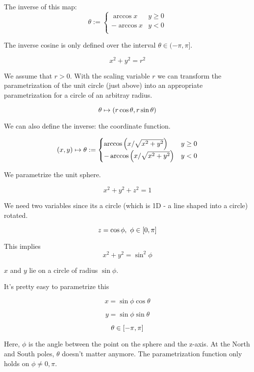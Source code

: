 \documentclass[11pt]{article}
\begin{document}
\begin{example}
  
  The inverse of this map:
  $$
  \theta :=
  \begin{cases}
    \arccos{x} & y \geq 0 \\
    - \arccos{x} & y < 0 \\
  \end{cases}
  $$

  The inverse cosine is only defined over the interval $\theta \in (-\pi, \pi]$.
\end{example}


\begin{example}

  $$x^2 + y^2 = r^2$$

  We assume that $r>0$.
  With the scaling variable $r$ we can transform the parametrization of the unit circle (just above) into an appropriate parametrization for a circle of an arbitray radius.

  
  $$
  \theta \mapsto \left ( r \cos \theta, r \sin \theta \right)
  $$

  We can also define the inverse: the coordinate function.

  $$
  \left ( x, y \right) \mapsto \theta := \begin{cases}
    \arccos \left ( x/\sqrt{x^2 + y^2} \right) & y \geq 0\\
    -\arccos \left ( x/\sqrt{x^2 + y^2} \right) & y < 0 \\
    \end{cases}
  $$
  
\end{example}

\begin{example}

  We parametrize the unit sphere.

  $$x^2 + y^2 + z^2 = 1$$

We need two variables since its a circle (which is 1D - a line shaped into a circle) rotated.

$$z = \cos \phi,\ \phi \in \left [ 0, \pi \right]$$

This implies $$x^2 +y^2 = \sin^2 \phi$$

$x$ and $y$ lie on a circle of radius $\sin \phi$.

It's pretty easy to parametrize this

$$x = \sin\phi \cos \theta$$

$$y = \sin\phi \sin \theta$$

$$\theta \in \left [ -\pi, \pi \right]$$

Here, $\phi$ is the angle between the point on the sphere and the z-axis.
At the North and South poles, $\theta$ doesn't matter anymore.
The parametrization function only holds on $\phi \neq 0,  \pi$.
\end{example}
\end{document}
